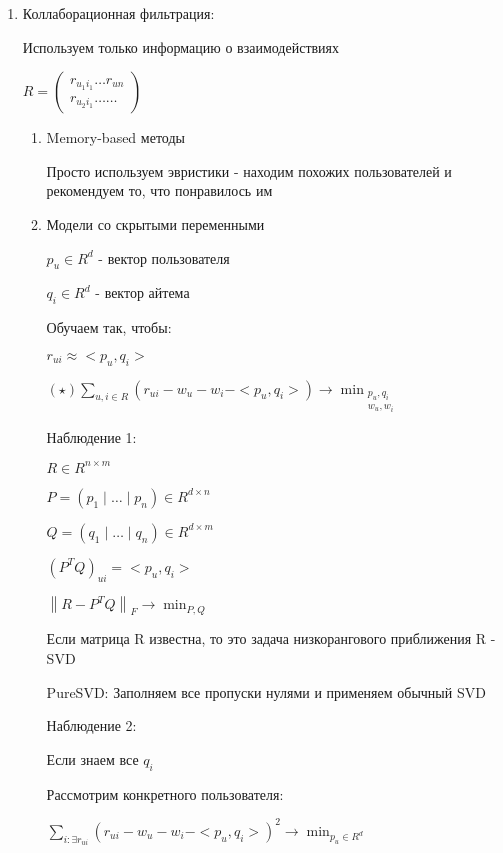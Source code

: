 \documentclass[a4paper, 12pt]{article}
\newcommand\norm[1]{\left\lVert#1\right\rVert}
\begin{document}
\begin{enumerate}
    \item Коллаборационная фильтрация:
    
    Используем только информацию о взаимодействиях

    $R = \begin{pmatrix}
        r_{u_1i_1} \ldots r_{un} \\
        r_{u_2i_1} \ldots \ldots
    \end{pmatrix}$

    \begin{enumerate}
        \item Memory-based методы
        
        Просто используем эвристики - 
        находим похожих пользователей и рекомендуем то,
        что понравилось им

        \item Модели со скрытыми переменными
        
        $p_u \in R^d$ - вектор пользователя

        $q_i \in R^d$ - вектор айтема

        Обучаем так, чтобы:

        $r_{ui} \approx <p_u, q_i>$

        $(\star) \sum_{u, i \in R} (r_{ui} - w_u - w_i - <p_u, q_i>) 
        \rightarrow \min_{\substack{p_u, q_i \\ w_u, w_i}}$

        Наблюдение 1:

        $R \in R^{n \times m}$

        $P = (p_1 \mid \ldots \mid p_n) \in R^{d \times n}$

        $Q = (q_1 \mid \ldots \mid q_n) \in R^{d \times m}$

        $(P^TQ)_{ui} = <p_u, q_i>$

        $\norm{R - P^TQ}_F \rightarrow \min_{P, Q}$

        Если матрица R известна, то это задача низкорангового 
        приближения R - SVD

        PureSVD: Заполняем все пропуски нулями и 
        применяем обычный SVD

        Наблюдение 2: 

        Если знаем все $q_i$

        Рассмотрим конкретного пользователя:

        $\sum_{i : \exists r_{ui}} (r_{ui} - w_u - 
        w_i - <p_u, q_i>)^2 \rightarrow \min_{p_u \in R^d}$


\end{enumerate}
\end{enumerate}
\end{document}
